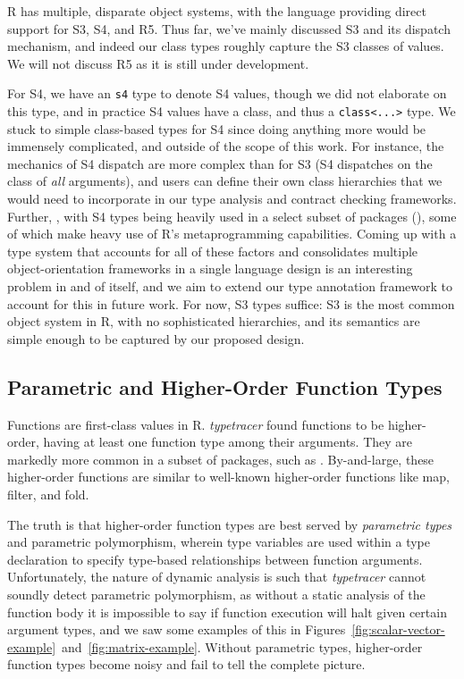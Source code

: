 \documentclass[acmsmall,review,anonymous]{acmart}\settopmatter{printfolios=true,printccs=false,printacmref=false}
\newcommand{\code}[1]{{\lstinline[style=Rin]!#1!}\xspace}
\newcommand{\typetracer}{\emph{typetracer}\xspace} %
\begin{document}
R has multiple, disparate object systems, with the language providing direct
support for S3, S4, and R5.  Thus far, we've mainly discussed S3 and its
dispatch mechanism, and indeed our class types roughly capture the S3
classes of values.  We will not discuss R5 as it is still under development.

For S4, we have an \code{s4} type to denote S4 values, though we did not
elaborate on this type, and in practice S4 values have a class, and thus a
\code{class<...>} type.  We stuck to simple class-based types for S4 since
doing anything more would be immensely complicated, and outside of the scope
of this work.  For instance, the mechanics of S4 dispatch are more complex
than for S3 (S4 dispatches on the class of {\it all} arguments), and users
can define their own class hierarchies that we would need to incorporate in
our type analysis and contract checking frameworks.  Further, , with S4 types being heavily used
in a select subset of packages (), some of which make heavy
use of R's metaprogramming capabilities.  Coming up with a type system that
accounts for all of these factors and consolidates multiple
object-orientation frameworks in a single language design is an interesting
problem in and of itself, and we aim to extend our type annotation framework
to account for this in future work.  For now, S3 types suffice: S3 is the
most common object system in R, with no sophisticated hierarchies, and its
semantics are simple enough to be captured by our proposed design.

%
%
%
%
\subsection{Parametric and Higher-Order Function Types}

Functions are first-class values in R.  \typetracer found 
functions to be higher-order, having at least one function type among their
arguments.  They are markedly more common in a subset of packages, such as
.  By-and-large, these higher-order functions are similar to
well-known higher-order functions like map, filter, and fold.

The truth is that higher-order function types are best served by {\it
  parametric types} and parametric polymorphism, wherein type variables are
used within a type declaration to specify type-based relationships between
function arguments.  Unfortunately, the nature of dynamic analysis is such
that \typetracer cannot soundly detect parametric polymorphism, as without a
static analysis of the function body it is impossible to say if function
execution will halt given certain argument types, and we saw some examples
of this in
Figures~\ref{fig:scalar-vector-example}~and~\ref{fig:matrix-example}.
Without parametric types, higher-order function types become noisy and fail
to tell the complete picture.
\end{document}
